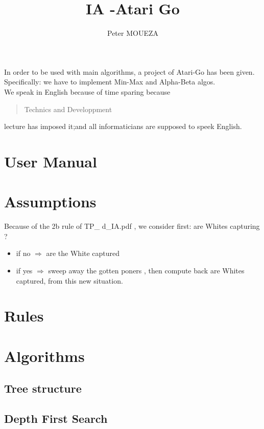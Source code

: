\documentclass{book}
\newcommand{\tmtextbf}[1]{{\bfseries{#1}}}
\begin{document}
\title{IA -Atari Go}
\author{Peter MOUEZA}
\maketitle


In order to be used with main algorithms, a project of Atari-Go has been given.
Specifically: we have to implement Min-Max  and Alpha-Beta algos.\\
We speak in English because of time sparing because \begin{quotation}
Technics and Developpment
\end{quotation} lecture has imposed it;and all informaticians are supposed to speek English.


\chapter{User Manual}

\chapter{Assumptions}
Because of the 2b \th rule of 
TP\_
d\_IA.pdf , we consider first: are Whites capturing 
?\\
\begin{itemize}
\item if no 
$
\Rightarrow
$
are the White captured
\item if yes 
$
\Rightarrow
$
sweep away the gotten poners , then compute back are Whites captured, from this new situation.
\end{itemize}

\chapter{Rules}
\chapter{Algorithms}

\section{Tree structure}
\section{Depth First Search}
\end{document}

